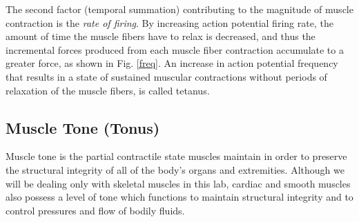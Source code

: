 \documentclass{article}
\begin{document}
The second factor (temporal summation) contributing to the magnitude of muscle contraction is the \textit{rate of firing}. By increasing action potential firing rate, the amount of time the muscle fibers have to relax is decreased, and thus the incremental forces produced from each muscle fiber contraction accumulate to a greater force, as shown in Fig. \ref{freq}. An increase in action potential frequency that results in a state of sustained muscular contractions without periods of relaxation of the muscle fibers, is called tetanus.

\subsection*{Muscle Tone (Tonus)}
Muscle tone is the partial contractile state muscles maintain in order to preserve the structural integrity of all of the body’s organs and extremities. Although we will be dealing only with skeletal muscles in this lab, cardiac and smooth muscles also possess a level of tone which functions to maintain structural integrity and to control pressures and flow of bodily fluids.
\end{document}
